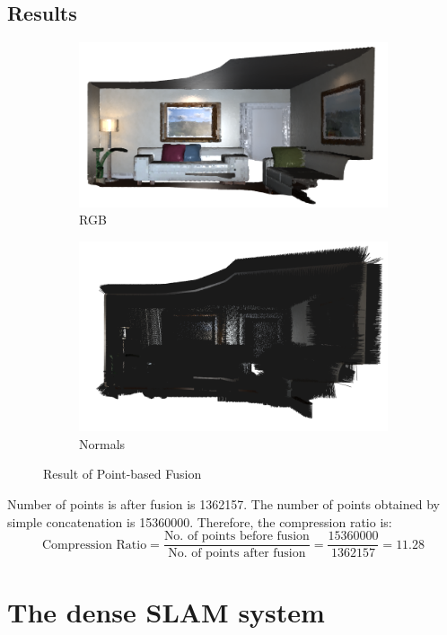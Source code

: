 \documentclass[12pt, a4paper]{article}
\begin{document}
\subsection{Results}
\begin{figure}[H]
  \centering
  \begin{subfigure}[b]{0.45\textwidth}
    \includegraphics[width=\textwidth]{./results/fusion/rgb.png}
    \caption{RGB}
  \end{subfigure}
  \hfill
  \begin{subfigure}[b]{0.45\textwidth}
    \includegraphics[width=\textwidth]{./results/fusion/normals.png}
    \caption{Normals}
  \end{subfigure}
  \caption{Result of Point-based Fusion}
\end{figure}
Number of points is after fusion is 1362157. The number of points obtained by simple concatenation is 15360000. Therefore, the compression ratio is:
\[\text{Compression Ratio} = \frac{\text{No. of points before fusion}}{\text{No. of points after fusion}} = \frac{15360000}{1362157} = 11.28\]
\section{The dense SLAM system}
\end{document}
